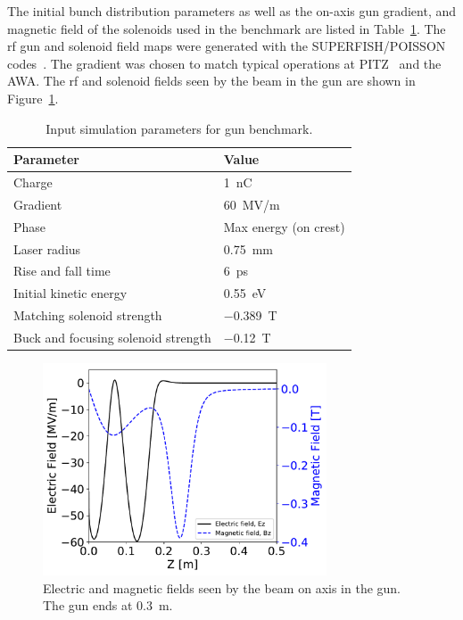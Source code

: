 The initial bunch distribution parameters as well as the 
on-axis gun gradient, and magnetic field of the solenoids used in 
the benchmark are listed in Table~\ref{tab:bench}. 
The rf gun and solenoid field maps were generated 
with the SUPERFISH/POISSON  codes~\cite{superfish}.
The gradient was chosen to match typical operations at PITZ~\cite{pitz}
and the AWA. The rf and solenoid fields seen by the beam in the gun are shown in Figure~\ref{fig:gunfields}.
\begin{table}
	\begin{center}
		\caption{Input simulation parameters for gun benchmark.}
		\label{tab:bench}
		\begin{tabular}{l l} 
	\toprule
	\toprule
	\textbf{Parameter} & \textbf{Value} \\ 
	\midrule
	Charge  & \SI{1}{nC} \\
	Gradient & \SI{60}{MV/m} \\
	
	Phase & Max energy (on crest) \\
	
	Laser radius & \SI{0.75}{mm} \\
	
	Rise and fall time & \SI{6}{ps} \\
	
	Initial kinetic energy & \SI{0.55}{eV} \\
	
	Matching solenoid strength & \SI{-0.389}{T} \\
	
	Buck and focusing solenoid strength & \SI{-0.12}{T} \\
	\bottomrule			
\end{tabular}
	\end{center}
\end{table}
\begin{figure}
	\begin{center}
		\includegraphics[width=0.75\textwidth]{images/gun_EM_fields}
		\caption{Electric and magnetic fields seen by the beam on axis in the gun. 
			The gun ends at \SI{0.3}{m}. }
		\label{fig:gunfields}
	\end{center}
\end{figure}

